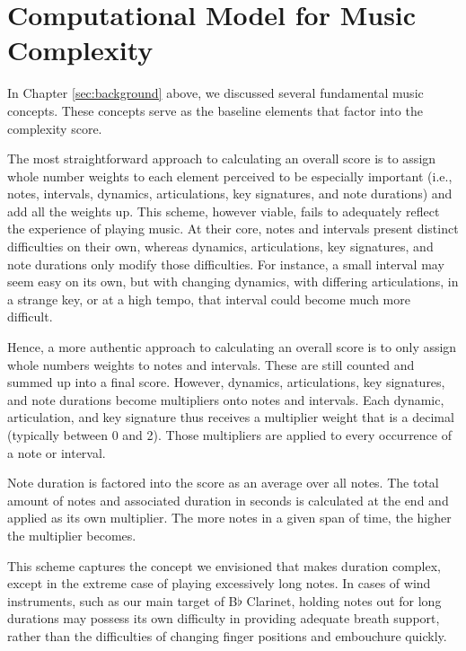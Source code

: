 \documentclass[12pt]{report}
\begin{document}
\chapter{Computational Model for Music Complexity} 
\label{sec:scoring}

In Chapter \ref{sec:background} above, we discussed several fundamental music concepts. These concepts serve as the baseline elements that factor into the complexity score. 

The most straightforward approach to calculating an overall score is to assign whole number weights to each element perceived to be especially important (i.e., notes, intervals, dynamics, articulations, key signatures, and note durations) and add all the weights up. This scheme, however viable, fails to adequately reflect the experience of playing music. At their core, notes and intervals present distinct difficulties on their own, whereas dynamics, articulations, key signatures, and note durations only modify those difficulties. For instance, a small interval may seem easy on its own, but with changing dynamics, with differing articulations, in a strange key, or at a high tempo, that interval could become much more difficult.

Hence, a more authentic approach to calculating an overall score is to only assign whole numbers weights to notes and intervals. These are still counted and summed up into a final score. However, dynamics, articulations, key signatures, and note durations become multipliers onto notes and intervals. Each dynamic, articulation, and key signature thus receives a multiplier weight that is a decimal (typically between 0 and 2). Those multipliers are applied to every occurrence of a note or interval.

Note duration is factored into the score as an average over all notes. The total amount of notes and associated duration in seconds is calculated at the end and applied as its own multiplier. The more notes in a given span of time, the higher the multiplier becomes.

This scheme captures the concept we envisioned that makes duration complex, except in the extreme case of playing excessively long notes. In cases of wind instruments, such as our main target of B$\flat$ Clarinet, holding notes out for long durations may possess its own difficulty in providing adequate breath support, rather than the difficulties of changing finger positions and embouchure quickly.
\end{document}
